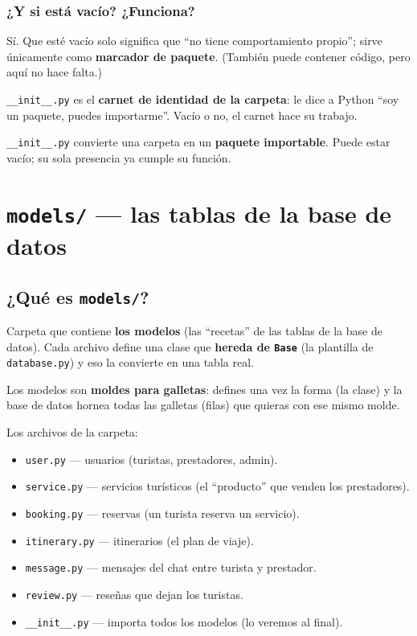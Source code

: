 \documentclass[11pt,a4paper]{article}
\begin{document}
\subsubsection{¿Y si está vacío? ¿Funciona?}

Sí. Que esté vacío solo significa que ``no tiene comportamiento propio''; sirve únicamente
como \textbf{marcador de paquete}. (También puede contener código, pero aquí no hace falta.)

\begin{analogia}
\texttt{\_\_init\_\_.py} es el \textbf{carnet de identidad de la carpeta}: le dice a Python
``soy un paquete, puedes importarme''. Vacío o no, el carnet hace su trabajo.
\end{analogia}

\begin{recuadro}
\texttt{\_\_init\_\_.py} convierte una carpeta en un \textbf{paquete importable}.
Puede estar vacío; su sola presencia ya cumple su función.
\end{recuadro}

\section{\texttt{models/} --- las tablas de la base de datos}

\subsection{¿Qué es \texttt{models/}?}

Carpeta que contiene \textbf{los modelos} (las ``recetas'' de las tablas de la base de datos).
Cada archivo define una clase que \textbf{hereda de \texttt{Base}} (la plantilla de
\texttt{database.py}) y eso la convierte en una tabla real.

\begin{analogia}
Los modelos son \textbf{moldes para galletas}: defines una vez la forma (la clase) y
la base de datos hornea todas las galletas (filas) que quieras con ese mismo molde.
\end{analogia}

Los archivos de la carpeta:
\begin{itemize}
    \item \texttt{user.py} --- usuarios (turistas, prestadores, admin).
    \item \texttt{service.py} --- servicios turísticos (el ``producto'' que venden los prestadores).
    \item \texttt{booking.py} --- reservas (un turista reserva un servicio).
    \item \texttt{itinerary.py} --- itinerarios (el plan de viaje).
    \item \texttt{message.py} --- mensajes del chat entre turista y prestador.
    \item \texttt{review.py} --- reseñas que dejan los turistas.
    \item \texttt{\_\_init\_\_.py} --- importa todos los modelos (lo veremos al final).
\end{itemize}
\end{document}
